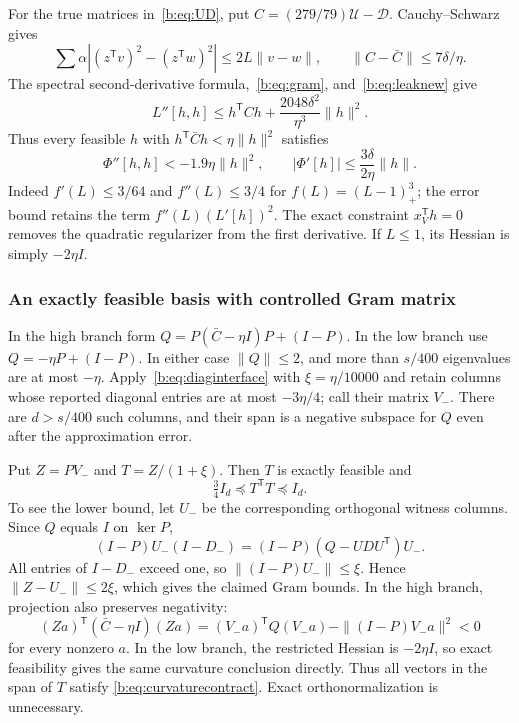 \documentclass[11pt]{amsart}
\theoremstyle{definition}\newtheorem{definition}[theorem]{Definition}
\theoremstyle{remark}\newtheorem{remark}[theorem]{Remark}
\numberwithin{equation}{section}
\newcommand{\T}{\mathsf T}
\begin{document}
For the true matrices in~\eqref{b:eq:UD}, put
$C=(279/79)\mathcal U-\mathcal D$.
Cauchy--Schwarz gives
\[
 \sum\alpha\left|(z^\T v)^2-(z^\T w)^2\right|
 \le2L\|v-w\|,
 \qquad \|C-\bar C\|\le7\delta/\eta.
\]
The spectral second-derivative formula,~\eqref{b:eq:gram}, and~\eqref{b:eq:leaknew}
give
\[
 L''[h,h]\le h^\T Ch+
       \frac{2048\delta^2}{\eta^3}\|h\|^2.
\]
Thus every feasible $h$ with $h^\T\bar C h<\eta\|h\|^2$ satisfies
\begin{equation}\label{b:eq:curvaturecontract}
 \Phi''[h,h]<-1.9\eta\|h\|^2,
 \qquad |\Phi'[h]|\le\frac{3\delta}{2\eta}\|h\|.
\end{equation}
Indeed $f'(L)\le3/64$ and $f''(L)\le3/4$ for
$f(L)=(L-1)_+^3$; the error bound retains the term $f''(L)(L'[h])^2$.
The exact constraint $x_V^\T h=0$ removes the quadratic regularizer from the
first derivative. If $L\le1$, its Hessian is simply $-2\eta I$.

\subsubsection{An exactly feasible basis with controlled Gram matrix}
In the high branch form
$Q=P(\bar C-\eta I)P+(I-P)$.
In the low branch use $Q=-\eta P+(I-P)$.
In either case $\|Q\|\le2$, and more than $s/400$ eigenvalues are at most
$-\eta$. Apply~\eqref{b:eq:diaginterface} with $\xi=\eta/10000$ and retain
columns whose reported diagonal entries are at most $-3\eta/4$; call their
matrix $V_-$. There are $d>s/400$ such columns, and their span is a negative
subspace for $Q$ even after the approximation error.

Put $Z=PV_-$ and $T=Z/(1+\xi)$. Then $T$ is exactly feasible and
\begin{equation}\label{b:eq:basisgram}
 \tfrac34 I_d\preceq T^\T T\preceq I_d.
\end{equation}
To see the lower bound, let $U_-$ be the corresponding orthogonal witness
columns. Since $Q$ equals $I$ on $\ker P$,
\[
 (I-P)U_-(I-D_-)=(I-P)(Q-UDU^\T)U_-.
\]
All entries of $I-D_-$ exceed one, so
$\|(I-P)U_-\|\le\xi$. Hence $\|Z-U_-\|\le2\xi$, which gives the claimed
Gram bounds. In the high branch, projection also preserves negativity:
\[
 (Za)^\T(\bar C-\eta I)(Za)
 =(V_-a)^\T Q(V_-a)-\|(I-P)V_-a\|^2<0
\]
for every nonzero $a$. In the low branch, the restricted Hessian is
$-2\eta I$, so exact feasibility gives the same curvature conclusion
directly. Thus all vectors in the span of $T$ satisfy
\eqref{b:eq:curvaturecontract}. Exact orthonormalization is unnecessary.
\end{document}
